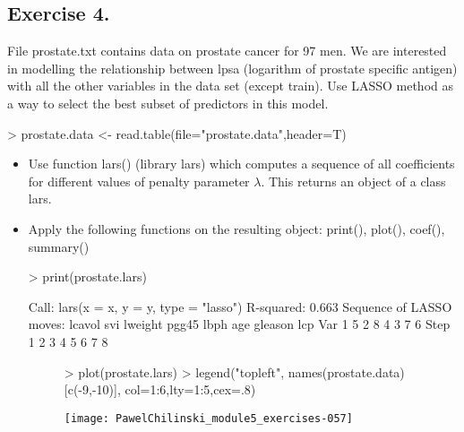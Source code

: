 \documentclass[a4paper]{article}
\begin{document}
\subsection{Exercise 4.} File prostate.txt contains data on prostate cancer for
97 men. We are interested in modelling the relationship between lpsa (logarithm of prostate specific antigen) with all the other variables in the data set (except train). 
Use LASSO method as a way to select the best subset of predictors in this model.
\begin{Schunk}
\begin{Sinput}
> prostate.data <- read.table(file="prostate.data",header=T)
\end{Sinput}
\end{Schunk}
\begin{itemize}
\item Use function lars() (library lars) which computes a sequence of all
coefficients for different values of penalty parameter $\lambda$. This returns an object of a class lars.
\begin{Schunk}
\end{Schunk}
\item Apply the following functions on the resulting object: print(), plot(),
coef(), summary()
\begin{Schunk}
\begin{Sinput}
> print(prostate.lars)	
\end{Sinput}
\begin{Soutput}
Call:
lars(x = x, y = y, type = "lasso")
R-squared: 0.663 
Sequence of LASSO moves:
     lcavol svi lweight pgg45 lbph age gleason lcp
Var       1   5       2     8    4   3       7   6
Step      1   2       3     4    5   6       7   8
\end{Soutput}
\end{Schunk}
\begin{figure}[H]
\begin{center}
\begin{Schunk}
\begin{Sinput}
> plot(prostate.lars)
> legend("topleft", names(prostate.data)[c(-9,-10)], col=1:6,lty=1:5,cex=.8)
\end{Sinput}
\end{Schunk}
\texttt{[image: PawelChilinski\_module5\_exercises-057]}

\end{center}
\end{figure}
\end{itemize}
\end{document}
